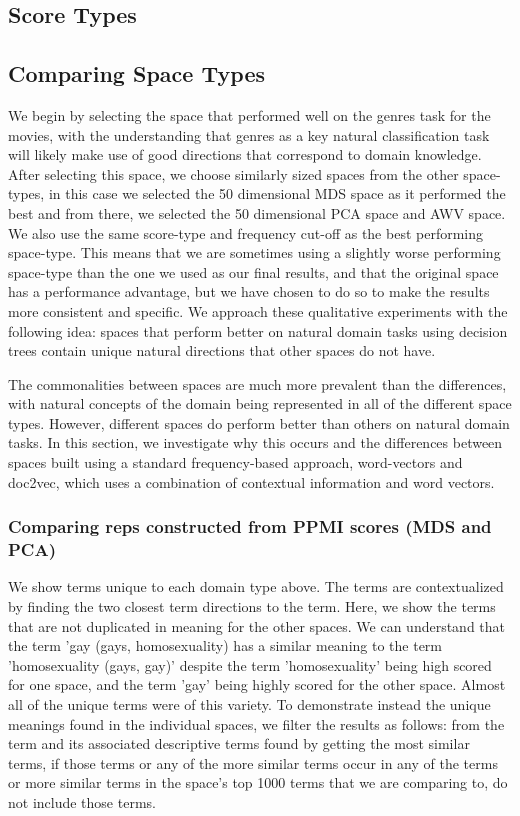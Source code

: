\subsection{Score Types}



\subsection{Comparing Space Types}

We begin by selecting the space that performed well on the genres task for the movies, with the understanding that genres as a key natural classification task will likely make use of good directions that correspond to domain knowledge. After selecting this space, we choose similarly sized spaces from the other space-types, in this case we selected the 50 dimensional MDS space as it performed the best and from there, we selected the 50 dimensional PCA space and AWV space. We also use the same score-type and frequency cut-off as the best performing space-type. This means that we are sometimes using a slightly worse performing space-type than the one we used as our final results, and that the original space has a performance advantage, but we have chosen to do so to make the results more consistent and specific. We approach these qualitative experiments with the following idea: spaces that perform better on natural domain tasks using decision trees contain unique natural directions that other spaces do not have. 

The commonalities between spaces are much more prevalent than the differences, with natural concepts of the domain being represented in all of the different space types. However, different spaces do perform better than others on natural domain tasks. In this section, we investigate why this occurs and the differences between spaces built using a standard frequency-based approach, word-vectors and doc2vec, which uses a combination of contextual information and word vectors. 

\subsubsection{Comparing reps constructed from PPMI scores (MDS and PCA)}

We show terms unique to each domain type above. The terms are contextualized by finding the two closest term directions to the term. Here, we show the terms that are not duplicated in meaning for the other spaces. We can understand that the term 'gay (gays, homosexuality) has a similar meaning to the term 'homosexuality (gays, gay)' despite the term 'homosexuality' being high scored for one space, and the term 'gay' being highly scored for the other space. Almost all of the unique terms were of this variety. To demonstrate instead the unique meanings found in the individual spaces, we filter the results as follows: from the term and its associated descriptive terms found by getting the most similar terms, if those terms or any of the more similar terms occur in any of the terms or more similar terms in the space's top 1000 terms that we are comparing to, do not include those terms.


